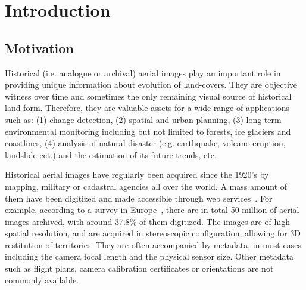 
\chapter{Introduction}
\label{chap:intro}
\minitoc

\section{Motivation}
Historical (i.e. analogue or archival) aerial images play an important role in providing unique information about evolution of land-covers. 
They are objective witness over time and sometimes the only remaining visual source of historical land-form. Therefore, they are valuable assets for a wide range of applications such as: (1) change detection, (2) spatial and urban planning, (3) long-term environmental monitoring including but not limited to forests, ice glaciers and coastlines, (4) analysis of natural disaster (e.g. earthquake, volcano eruption, landslide ect.) and the estimation of its future trends, etc.
\par
Historical aerial images have regularly been acquired since the 1920’s by mapping, military or cadastral agencies all over the world. A mass amount of them have been digitized and made accessible through web services~\cite{sebastien2019archiving,earthexplorer,remonterletemps}. 
For example, according to a survey in Europe~\cite{sebastien2019archiving}, there are in total 50 million of aerial images archived, with around 37.8\% of them digitized.
The images are of high spatial resolution, and are acquired in stereoscopic configuration, allowing for 3D restitution of territories. 
They are often accompanied by metadata, in most cases including the camera focal length and the physical sensor size. Other metadata such as flight plans, camera calibration certificates or orientations are not commonly available. 
